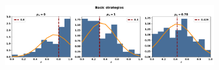 \begin{figure}[!htbp]
\begin{subfigure}{\textwidth}
    \end{subfigure}
    \par\bigskip
    \begin{subfigure}{\textwidth}
    \includegraphics[width=\textwidth]{src/chapters/07/img/normalised_rank_classification_basic_strategies.pdf}
    \end{subfigure}
\end{figure}

\begin{table}[!htbp]
    \begin{center}
    \resizebox{.9\textwidth}{!}{
        
    }
\end{center}
\end{table}

